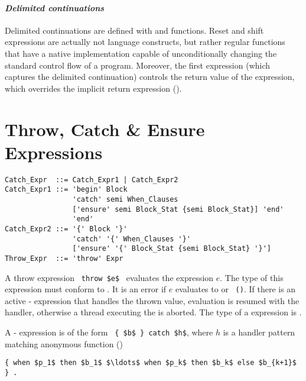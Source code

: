 \paragraph{\em Delimited continuations}
Delimited continuations are defined with  and  functions. Reset and shift expressions are actually not language constructs, but rather regular functions that have a native implementation capable of unconditionally changing the standard control flow of a program. Moreover, the first  expression (which captures the delimited continuation) controls the return value of the  expression, which overrides the implicit return expression ().








\section{Throw, Catch \& Ensure Expressions}
\label{sec:throw-catch-expressions}

\syntax\begin{lstlisting}
Catch_Expr  ::= Catch_Expr1 | Catch_Expr2
Catch_Expr1 ::= 'begin' Block 
                'catch' semi When_Clauses
                ['ensure' semi Block_Stat {semi Block_Stat}] 'end'
                'end'
Catch_Expr2 ::= '{' Block '}'
                'catch' '{' When_Clauses '}'
                ['ensure' '{' Block_Stat {semi Block_Stat} '}']
Throw_Expr  ::= 'throw' Expr
\end{lstlisting}

A throw expression ~\lstinline!throw $e$!~ evaluates the expression $e$. The type of this expression must conform to . It is an error if $e$ evaluates to  or ~\lstinline!()!. If there is an active - expression that handles the thrown value, evaluation is resumed with the handler, otherwise a thread executing the  is aborted. The type of a  expression is . 

A - expression is of the form ~\lstinline!{ $b$ } catch $h$!, where $h$ is a handler pattern matching anonymous function ()
\begin{lstlisting}
{ when $p_1$ then $b_1$ $\ldots$ when $p_k$ then $b_k$ else $b_{k+1}$ } .
\end{lstlisting}

